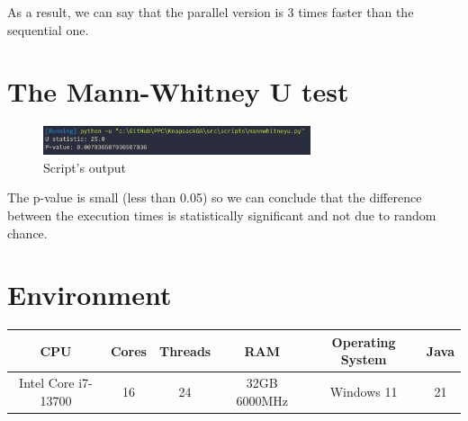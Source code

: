 \documentclass[11pt]{report}
\begin{document}
  \vspace{12pt}

  As a result, we can say that the parallel version is 3 times faster than the sequential one.
  
\section*{The Mann-Whitney U test}

\begin{figure}[h]
  \centering
  \includegraphics[width=0.7\textwidth]{script.png}
  \caption{Script's output}
  
\end{figure}

The p-value is small (less than 0.05) so we can conclude that the difference between 
the execution times is statistically significant and not due to random chance.
\section*{Environment}
\begin{tabular}{|c|c|c|c|c|c|}
  \hline
  CPU & Cores & Threads & RAM &  Operating System & Java\\
  \hline
  Intel Core i7-13700 & 16 & 24 & 32GB 6000MHz & Windows 11 & 21\\
  \hline
\end{tabular}
\end{document}
